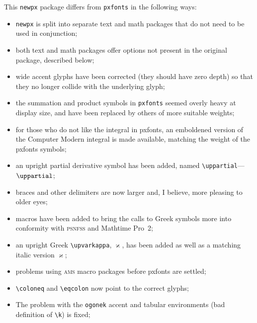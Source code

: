 \documentclass[11pt]{article}
\theoremstyle{oldplain}
\theoremstyle{plain}
\begin{document}
%


This {\tt newpx} package differs from {\tt pxfonts} in the following ways:
\begin{itemize}
\item
{\tt newpx} is split into separate text and math packages that do not need to be used in conjunction;
\item both text and math packages offer options not present in the original package, described below;
\item wide accent glyphs have been corrected (they should have zero depth) so that they no longer collide with the underlying glyph;
\item the summation and product symbols in {\tt pxfonts} seemed overly heavy at display size, and have been replaced by others of more suitable weights;
\item for those who do not like the integral in \textsf{pxfonts}, an emboldened version of the Computer Modern integral is made available, matching the weight of the \textsf{pxfonts} symbols;
\item an upright partial derivative symbol has been added, named \verb|\uppartial|---$\uppartial$;
\item 
braces and other delimiters are now larger and, I believe, more pleasing to older eyes;
\item macros have been added to bring the calls to Greek symbols more into conformity with \textsc{psnfss} and Mathtime Pro~2;
\item an upright Greek \verb|\upvarkappa|, $\upvarkappa$, has been added as well as a matching italic version $\varkappa$;
\item problems using \textsc{ams} macro packages before \textsf{pxfonts} are settled;
\item \verb|\coloneq| and \verb|\eqcolon| now point to the correct glyphs;
\item The problem with the {\tt ogonek} accent  and tabular environments (bad definition of \verb|\k|) is fixed;

\end{itemize}
\end{document}
